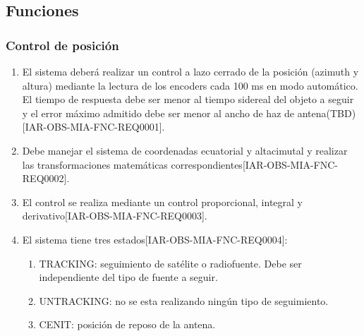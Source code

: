 \documentclass[12pt,a4paper, twosite]{article}
\begin{document}
	\subsection{Funciones}
	\label{sec:org307bb59}
	\subsubsection{Control de posición}
	\begin{enumerate}
		\item El sistema deberá realizar un control a lazo cerrado de la posición (azimuth y altura) mediante la lectura de los encoders cada 100 ms en modo automático. El tiempo de respuesta debe ser menor al tiempo sidereal del objeto a seguir y el error máximo admitido debe ser menor al ancho de haz de antena(TBD)[IAR-OBS-MIA-FNC-REQ0001]. 
		\item Debe  manejar el sistema de coordenadas ecuatorial y altacimutal y realizar las transformaciones matemáticas correspondientes[IAR-OBS-MIA-FNC-REQ0002]. 
		\item El control se realiza mediante un control proporcional, integral y derivativo[IAR-OBS-MIA-FNC-REQ0003]. 
		\item El sistema tiene tres estados[IAR-OBS-MIA-FNC-REQ0004]: 
			\begin{enumerate}
				\item TRACKING: seguimiento de satélite o radiofuente. Debe ser independiente del tipo de fuente a seguir.
				\item UNTRACKING: no se esta realizando ningún tipo de seguimiento. 
				\item CENIT: posición de reposo de la antena.
			\end{enumerate}

	\end{enumerate}
\end{document}
